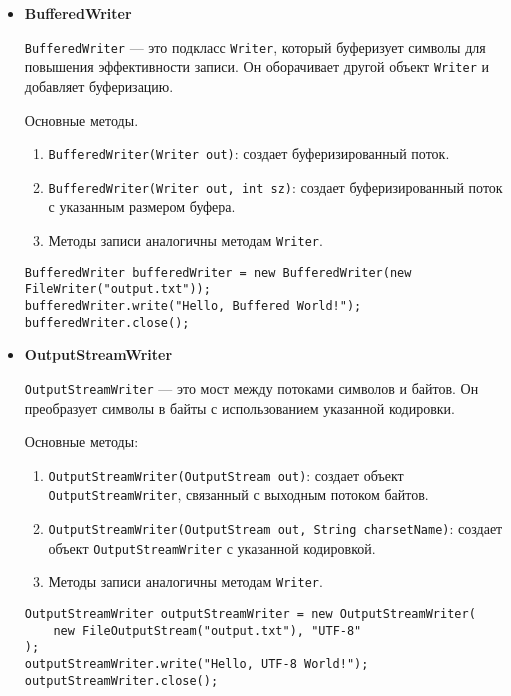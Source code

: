 \begin{itemize}
    \item \textbf{BufferedWriter} \par
    \texttt{BufferedWriter} — это подкласс \texttt{Writer}, который буферизует символы для повышения эффективности записи. Он оборачивает другой объект \texttt{Writer} и добавляет буферизацию. \par
    Основные методы.
    \begin{enumerate}
        \item \texttt{BufferedWriter(Writer out)}: создает буферизированный поток.
        \item \texttt{BufferedWriter(Writer out, int sz)}: создает буферизированный поток с указанным размером буфера.
        \item Методы записи аналогичны методам \texttt{Writer}.
    \end{enumerate}
    \begin{verbatim}
BufferedWriter bufferedWriter = new BufferedWriter(new FileWriter("output.txt"));
bufferedWriter.write("Hello, Buffered World!");
bufferedWriter.close();
    \end{verbatim}

    \item \textbf{OutputStreamWriter} \par
    \texttt{OutputStreamWriter} — это мост между потоками символов и байтов. Он преобразует символы в байты с использованием указанной кодировки.\par
    Основные методы:
    \begin{enumerate}
        \item \texttt{OutputStreamWriter(OutputStream out)}: создает объект \texttt{OutputStreamWriter}, связанный с выходным потоком байтов.
        \item \texttt{OutputStreamWriter(OutputStream out, String charsetName)}: создает объект \texttt{OutputStreamWriter} с указанной кодировкой.
        \item Методы записи аналогичны методам \texttt{Writer}.
    \end{enumerate}
    \begin{verbatim}
OutputStreamWriter outputStreamWriter = new OutputStreamWriter(
    new FileOutputStream("output.txt"), "UTF-8"
);
outputStreamWriter.write("Hello, UTF-8 World!");
outputStreamWriter.close();
    \end{verbatim}
    

\end{itemize}
